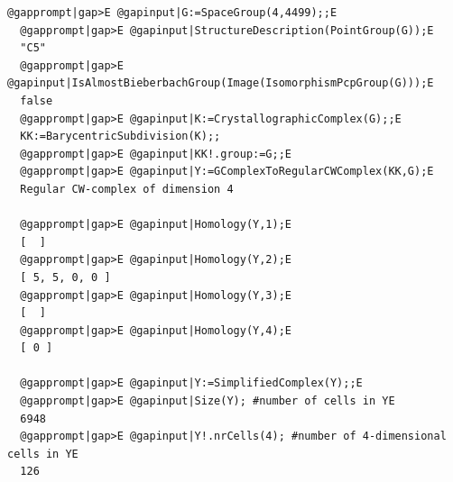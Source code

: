 \documentclass[a4paper,11pt]{report}
\begin{document}
{{\begin{Verbatim}[commandchars=@|E,fontsize=\small,frame=single,label=Example]
  @gapprompt|gap>E @gapinput|G:=SpaceGroup(4,4499);;E
  @gapprompt|gap>E @gapinput|StructureDescription(PointGroup(G));E
  "C5"
  @gapprompt|gap>E @gapinput|IsAlmostBieberbachGroup(Image(IsomorphismPcpGroup(G)));E
  false
  @gapprompt|gap>E @gapinput|K:=CrystallographicComplex(G);;E
  KK:=BarycentricSubdivision(K);;
  @gapprompt|gap>E @gapinput|KK!.group:=G;;E
  @gapprompt|gap>E @gapinput|Y:=GComplexToRegularCWComplex(KK,G);E
  Regular CW-complex of dimension 4
  
  @gapprompt|gap>E @gapinput|Homology(Y,1);E
  [  ]
  @gapprompt|gap>E @gapinput|Homology(Y,2);E
  [ 5, 5, 0, 0 ]
  @gapprompt|gap>E @gapinput|Homology(Y,3);E
  [  ]
  @gapprompt|gap>E @gapinput|Homology(Y,4);E
  [ 0 ]
  
  @gapprompt|gap>E @gapinput|Y:=SimplifiedComplex(Y);;E
  @gapprompt|gap>E @gapinput|Size(Y); #number of cells in YE
  6948
  @gapprompt|gap>E @gapinput|Y!.nrCells(4); #number of 4-dimensional cells in YE
  126
  
  
\end{Verbatim}
 }

 }

 
\end{document}
